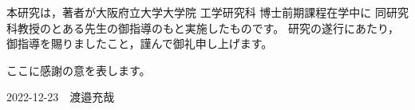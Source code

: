 
本研究は，著者が大阪府立大学大学院 工学研究科 博士前期課程在学中に
同研究科教授のとある先生の御指導のもと実施したものです。
研究の遂行にあたり，御指導を賜りましたこと，謹んで御礼申し上げます。

ここに感謝の意を表します。

\begin{flushright}
    2022-12-23　渡邉充哉
\end{flushright}
